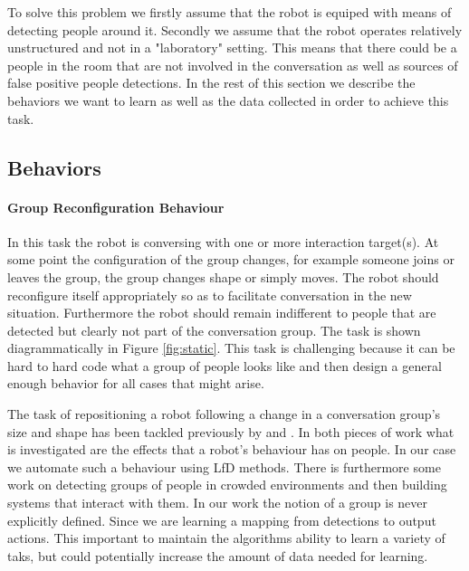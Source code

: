 \documentclass[letterpaper, 10 pt, conference]{ieeeconf}
\begin{document}
To solve this problem we firstly assume that the robot is equiped with means of detecting people around it. Secondly we assume that the robot operates relatively unstructured and not in a "laboratory" setting. This means that there could be a people in the room that are not involved in the conversation as well as sources of false positive people detections. In the rest of this section we describe the behaviors we want to learn as well as the data collected in order to achieve this task. 

\subsection{Behaviors \label{subsec:behaviors}}

\paragraph{Group Reconfiguration Behaviour} In this task the robot is conversing with one or more interaction target(s). At some point the configuration of the group changes, for example someone joins or leaves the group, the group changes shape or simply moves. The robot should reconfigure itself appropriately so as to facilitate conversation in the new situation. Furthermore the robot should remain indifferent to people that are detected but clearly not part of the conversation group. The task is shown diagrammatically in Figure \ref{fig:static}. This task is challenging because it can be hard to hard code what a group of people looks like and then design a general enough behavior for all cases that might arise.

The task of repositioning a robot following a change in a conversation group's size and shape has been tackled previously by \cite{kuzuoka2010reconfiguring} and \cite{vroon2015dynamics}. In both pieces of work what is investigated are the effects that a robot's behaviour has on people. In our case we automate such a behaviour using LfD methods.  There is furthermore some work on detecting groups of people in crowded environments \cite{lau2010multi} and then building systems that interact with them. In our work the notion of a group is never explicitly defined. Since we are learning a mapping from detections to output actions. This important to maintain the algorithms ability to learn a variety of taks, but could potentially increase the amount of data needed for learning.
\end{document}
